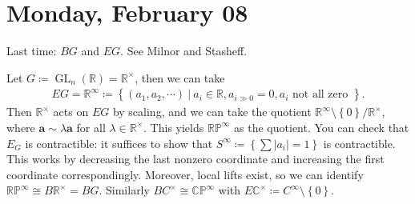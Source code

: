 \hypertarget{monday-february-08}{%
\section{Monday, February 08}\label{monday-february-08}}

Last time: \(BG\) and \(EG\). See Milnor and Stasheff.

\begin{example}[?]

Let
\(G \coloneqq\operatorname{GL}_n({\mathbb{R}}) = {\mathbb{R}}^{\times}\),
then we can take
\begin{align*}
EG = {\mathbb{R}}^{\infty } \coloneqq\left\{{ (a_1, a_2, \cdots ) {~\mathrel{\Big|}~}a_i \in {\mathbb{R}}, a_{i\gg 0} = 0, a_i \text{ not all zero } }\right\}
.\end{align*}
Then \({\mathbb{R}}^{\times}\) acts on \(EG\) by scaling, and we can
take the quotient
\({\mathbb{R}}^{\infty } \setminus\left\{{0}\right\}/ {\mathbb{R}}^{\times}\),
where \(\mathbf{a} \sim \lambda \mathbf{a}\) for all
\(\lambda \in {\mathbb{R}}^{\times}\). This yields
\({\mathbb{RP}}^{\infty }\) as the quotient. You can check that \(E_G\)
is contractible: it suffices to show that
\(S^{\infty } \coloneqq\left\{{ \sum {\left\lvert {a_i} \right\rvert} = 1 }\right\}\)
is contractible. This works by decreasing the last nonzero coordinate
and increasing the first coordinate correspondingly. Moreover, local
lifts exist, so we can identify
\({\mathbb{RP}}^{\infty } \cong B{\mathbb{R}}^{\times}= BG\). Similarly
\(BC^{\times}\cong {\mathbb{CP}}^{\infty }\) with
\(E{\mathbb{C}}^{\times}\coloneqq C^{\infty } \setminus\left\{{0}\right\}\).

\end{example}

